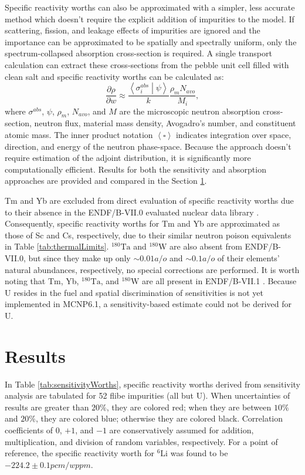 \documentclass[11pt]{article}
\newcommand{\braket}[2]{\left<#1\middle|#2\right>}
\newcommand{\iso}[2]{$^{#2}\mathrm{#1}$}
\newcommand{\tild}[0]{\sim\!\!}
\begin{document}
Specific reactivity worths can also be approximated with a simpler, less accurate method which doesn't require the explicit addition of impurities to the model.
If scattering, fission, and leakage effects of impurities are ignored and the importance can be approximated to be spatially and spectrally uniform, only the spectrum-collapsed absorption cross-section is required.
A single transport calculation can extract these cross-sections from the pebble unit cell filled with clean salt and specific reactivity worths can be calculated as:
\begin{equation}
    \frac{\partial\rho}{\partial w}
    \approx \frac{\braket{\sigma_i^{abs}}{\psi}}{k} \frac{\rho_m N_{avo}}{M_i}
    ,
\end{equation}
where $\sigma^{abs}$, $\psi$, $\rho_m$, $N_{avo}$, and $M$ are the microscopic neutron absorption cross-section, neutron flux, material mass density, Avogadro's number, and constituent atomic mass.
The inner product notation $\left<\square\right>$ indicates integration over space, direction, and energy of the neutron phase-space.
Because the approach doesn't require estimation of the adjoint distribution, it is significantly more computationally efficient.
Results for both the sensitivity and absorption approaches are provided and compared in the Section \ref{sec:results}.

Tm and Yb are excluded from direct evaluation of specific reactivity worths due to their absence in the ENDF/B-VII.0 evaluated nuclear data library \cite{chadwick2006endf70}.
Consequently, specific reactivity worths for Tm and Yb are approximated as those of Sc and Cs, respectively, due to their similar neutron poison equivalents in Table \ref{tab:thermalLimits}.
\iso{Ta}{180} and \iso{W}{180} are also absent from ENDF/B-VII.0, but since they make up only $\tild 0.01a/o$ and $\tild 0.1a/o$ of their elements' natural abundances, respectively, no special corrections are performed.
It is worth noting that Tm, Yb, \iso{Ta}{180}, and \iso{W}{180} are all present in ENDF/B-VII.1 \cite{chadwick2011endb71}.
Because U resides in the fuel and spatial discrimination of sensitivities is not yet implemented in MCNP6.1, a sensitivity-based estimate could not be derived for U.

\section{Results}
\label{sec:results}

In Table \ref{tab:sensitivityWorths}, specific reactivity worths derived from sensitivity analysis are tabulated for 52 flibe impurities (all but U).
When uncertainties of results are greater than $20\%$, they are colored red; when they are between $10\%$ and $20\%$, they are colored blue; otherwise they are colored black.
Correlation coefficients of $0$, $+1$, and $-1$ are conservatively assumed for addition, multiplication, and division of random variables, respectively.
For a point of reference, the specific reactivity worth for \iso{Li}{6} was found to be $-224.2\pm0.1pcm/wppm$.
\end{document}

